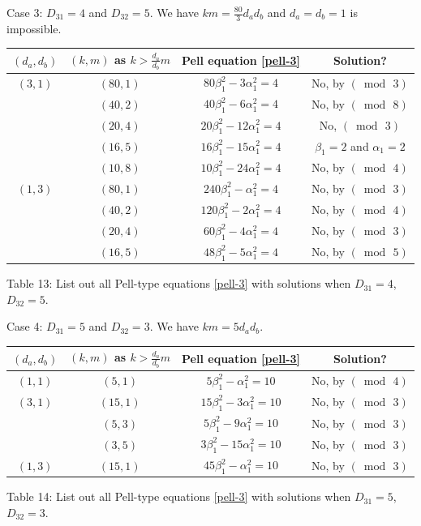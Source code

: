 \documentclass[12pt]{article}
\begin{document}
Case 3: $D_{31} = 4$ and $D_{32} = 5$. We have $k m = \frac{80}{3} d_a d_b$ and $d_a = d_b = 1$ is impossible.

\begin{center}
\begin{tabular}{|c|c|c|c|}
\hline $(d_a, d_b)$ & $(k, m)$ as $k > \frac{d_a}{d_b} m$ & Pell equation \eqref{pell-3} & Solution? \\
\hline $(3,1)$ & $(80,1)$ & $80\beta_1^2-3\alpha_1^2=4$ & No, by $(\bmod \, 3)$\\
\hline & $(40,2)$ & $40\beta_1^2-6\alpha_1^2=4$ & No, by $(\bmod \, 8)$\\
\hline & $(20,4)$ & $20\beta_1^2-12\alpha_1^2=4$ & No, $(\bmod \, 3)$\\
\hline & $(16,5)$ & $16\beta_1^2-15\alpha_1^2=4$ & $\beta_1=2$ and $\alpha_1=2$\\
\hline & $(10,8)$ & $10\beta_1^2-24\alpha_1^2=4$ & No, by $(\bmod \, 4)$\\
\hline $(1,3)$ & $(80,1)$ & $240\beta_1^2-\alpha_1^2=4$ & No, by $(\bmod \, 3)$\\
\hline & $(40,2)$ & $120\beta_1^2-2\alpha_1^2=4$ & No, by $(\bmod \, 4)$\\
\hline & $(20,4)$ & $60\beta_1^2-4\alpha_1^2=4$ & No, by $(\bmod \, 3)$\\
\hline & $(16,5)$ & $48\beta_1^2-5\alpha_1^2=4$ & No, by $(\bmod \, 5)$\\
\hline
\end{tabular}
\newline \small{Table 13: List out all Pell-type equations \eqref{pell-3} with solutions when $D_{31} = 4$, $D_{32} = 5$.}
\end{center}

Case 4: $D_{31} = 5$ and $D_{32} = 3$. We have $k m = 5 d_a d_b$.

\begin{center}
\begin{tabular}{|c|c|c|c|}
\hline $(d_a, d_b)$ & $(k, m)$ as $k > \frac{d_a}{d_b} m$ & Pell equation \eqref{pell-3} & Solution? \\
\hline $(1,1)$ & $(5,1)$ & $5\beta_1^2-\alpha_1^2=10$ & No, by $(\bmod \, 4)$\\
\hline $(3,1)$ & $(15,1)$ & $15\beta_1^2-3\alpha_1^2=10$ & No, by $(\bmod \, 3)$\\
\hline & $(5,3)$ & $5\beta_1^2-9\alpha_1^2=10$ & No, by $(\bmod \, 3)$\\
\hline & $(3,5)$ & $3\beta_1^2-15\alpha_1^2=10$ & No, by $(\bmod \, 3)$\\
\hline $(1,3)$ & $(15,1)$ & $45\beta_1^2-\alpha_1^2=10$ & No, by $(\bmod \, 3)$\\
\hline
\end{tabular}
\newline \small{Table 14: List out all Pell-type equations \eqref{pell-3} with solutions when $D_{31} = 5$, $D_{32} = 3$.}
\end{center}
\end{document}
